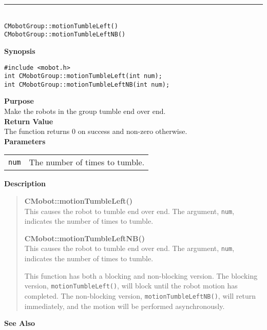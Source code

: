 \noindent
\vspace{5pt}
\rule{4.5in}{0.015in}\\
\noindent
{\LARGE \texttt{CMobotGroup::motionTumbleLeft()}}\\
{\LARGE \texttt{CMobotGroup::motionTumbleLeftNB()}}\\
{}

\noindent
{\bf Synopsis}
\vspace{-8pt}
\begin{verbatim}
#include <mobot.h>
int CMobotGroup::motionTumbleLeft(int num);
int CMobotGroup::motionTumbleLeftNB(int num);
\end{verbatim}

\noindent
{\bf Purpose}\\
Make the robots in the group tumble end over end.\\

\noindent
{\bf Return Value}\\
The function returns 0 on success and non-zero otherwise.\\

\noindent
{\bf Parameters}\\
\vspace{-0.1in}
\begin{description}
\item               
\begin{tabular}{p{10 mm}p{145 mm}}
\texttt{num} & The number of times to tumble. \\
\end{tabular}
\end{description}

\noindent
{\bf Description}\\
\vspace{-12pt}
\begin{quote}
{\bf CMobot::motionTumbleLeft()}\\
This causes the robot to tumble end over end. The argument, \texttt{num},
indicates the number of times to tumble.

{\bf CMobot::motionTumbleLeftNB()}\\
This causes the robot to tumble end over end. The argument, \texttt{num},
indicates the number of times to tumble.

This function has both a blocking and non-blocking version.
The blocking version, \texttt{motionTumbleLeft()}, will block until the
robot motion has completed. The non-blocking version, \texttt{motionTumbleLeftNB()},
will return immediately, and the motion will be performed asynchronously.\\
\end{quote}

\noindent
{\bf See Also}\\

